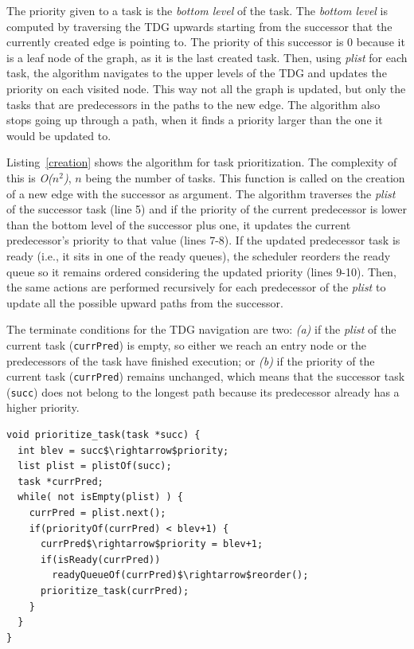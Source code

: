 
The priority given to a task is the \textit{bottom level} of the task. The \textit{bottom level} is computed by traversing the TDG upwards starting from the successor that the currently created edge is pointing to. The priority of this successor is 0 because it is a leaf node of the graph, as it is the last created task. Then, using \textit{plist} for each task, the algorithm navigates to the upper levels of the TDG and updates the priority on each visited node. This way not all the graph is updated, but only the tasks that are predecessors in the paths to the new edge. The algorithm also stops going up through a path, when it finds a priority larger than the one it would be updated to.

Listing~\ref{creation} shows the algorithm for task prioritization. The complexity of this is \textit{O($n^2$)}, \textit{$n$} being the number of tasks. This function is called on the creation of a new edge with the successor as argument. The algorithm traverses the \textit{plist} of the successor task (line 5) and if the priority of the current predecessor is lower than the bottom level of the successor plus one, it updates the current predecessor's priority to that value (lines 7-8). If the updated predecessor task is ready (i.e., it sits in one of the ready queues), the scheduler reorders the ready queue so it remains ordered considering the updated priority (lines 9-10). Then, the same actions are performed recursively for each predecessor of the \textit{plist} to update all the possible upward paths from the successor. 

The terminate conditions for the TDG navigation are two: \textit{(a)} if the \textit{plist} of the current task (\texttt{currPred}) is empty, so either we reach an entry node or the predecessors of the task have finished execution; or \textit{(b)} if the priority of the current task (\texttt{currPred}) remains unchanged, which means that the successor task (\texttt{succ}) does not belong to the longest path because its predecessor already has a higher priority. 
\begin{lstlisting}[float, emph={non_critical_queue, critical_queue,prioritize_task}, caption={Pseudo-code task prioritization with CATS.},label=creation, frame=tb]
void prioritize_task(task *succ) {
  int blev = succ$\rightarrow$priority;
  list plist = plistOf(succ);
  task *currPred;
  while( not isEmpty(plist) ) {
    currPred = plist.next();  
    if(priorityOf(currPred) < blev+1) {
      currPred$\rightarrow$priority = blev+1;
      if(isReady(currPred)) 
        readyQueueOf(currPred)$\rightarrow$reorder();
      prioritize_task(currPred);
    }
  }
}
\end{lstlisting}
